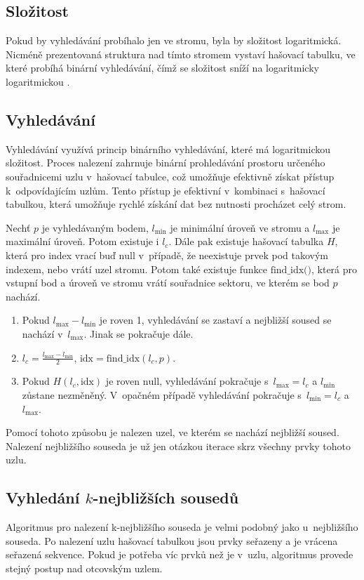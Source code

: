 \subsection*{Složitost}
Pokud by vyhledávání probíhalo jen ve stromu, byla by složitost logaritmická. Nicméně prezentovaná struktura nad tímto stromem vystaví hašovací tabulku, ve které probíhá binární vyhledávání, čímž se složitost sníží na logaritmicky logaritmickou \cite{octreehash}. 


\subsection*{Vyhledávání}
Vyhledávání využívá princip binárního vyhledávání, které má logaritmickou složitost. Proces nalezení zahrnuje binární prohledávání prostoru určeného souřadnicemi uzlu v~hašovací tabulce, což umožňuje efektivně získat přístup k~odpovídajícím uzlům. Tento přístup je  efektivní v~kombinaci s~hašovací tabulkou, která umožňuje rychlé získání dat bez nutnosti procházet celý strom.

Nechť \( p \) je vyhledávaným bodem, \( l_{\text{min}} \) je minimální úroveň ve stromu a \( l_{\text{max}} \) je maximální úroveň. Potom existuje i \( l_c \). Dále pak existuje hašovací tabulka \( H \), která pro index vrací buď \( \text{null} \) v~případě, že neexistuje prvek pod takovým indexem, nebo vrátí uzel stromu. Potom také existuje funkce \( \text{find\_idx()} \), která pro vstupní bod a úroveň ve stromu vrátí souřadnice sektoru, ve kterém se bod \( p \) nachází.
\begin{enumerate}
    \item Pokud \( l_{\text{max}} - l_{\text{min}} \) je roven 1, vyhledávání se zastaví a nejbližší soused se nachází v~\( l_{\text{max}} \). Jinak se pokračuje dále.
    \item \( l_c = \frac{l_{\text{max}} - l_{\text{min}}}{2} \), \( \text{idx} = \text{find\_idx}(l_c, p) \).
    \item Pokud \( H(l_c, \text{idx}) \) je roven \( \text{null} \), vyhledávání pokračuje s~\( l_{\text{max}} = l_c \) a \( l_{\text{min}} \) zůstane nezměněný. V~opačném případě vyhledávání pokračuje s~\( l_{\text{min}} = l_c \) a \( l_{\text{max}} \).
\end{enumerate}

Pomocí tohoto způsobu je nalezen uzel, ve kterém se nachází nejbližší soused. Nalezení nejbližšího souseda je už jen otázkou iterace skrz všechny prvky tohoto uzlu. 

\subsection*{Vyhledání $k$-nejbližších sousedů}
Algoritmus pro nalezení k-nejbližšího souseda je velmi podobný jako u~nejbližšího souseda. Po nalezení uzlu hašovací tabulkou jsou prvky seřazeny a je vrácena seřazená sekvence. Pokud je potřeba víc prvků než je v~uzlu, algoritmus provede stejný postup nad otcovským uzlem.

